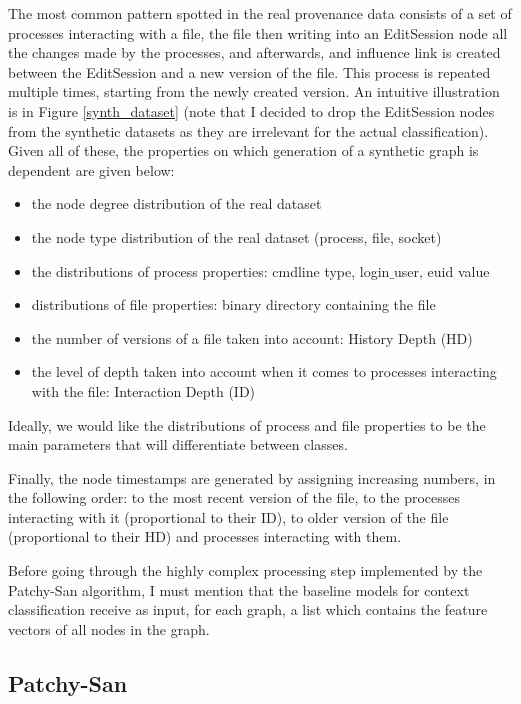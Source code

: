 The most common pattern spotted in the real provenance data consists of a set of processes interacting with a file, the file then writing into an EditSession node all the changes made by the processes, and afterwards, and influence link is created between the EditSession and a new version of the file. This process is repeated multiple times, starting from the newly created version. An intuitive illustration is in Figure \ref{synth_dataset} (note that I decided to drop the EditSession nodes from the synthetic datasets as they are irrelevant for the actual classification). Given all of these, the properties on which generation of a synthetic graph is dependent are given below:

\begin{itemize}
    \item the node degree distribution of the real dataset
    \item the node type distribution of the real dataset (process, file, socket)
    \item the distributions of process properties: cmdline type, login$\_$user, euid value
    \item distributions of file properties: binary directory containing the file
    \item the number of versions of a file taken into account: History Depth (HD)
    \item the level of depth taken into account when it comes to processes interacting with the file: Interaction Depth (ID)
\end{itemize}

Ideally, we would like the distributions of process and file properties to be the main parameters that will differentiate between classes. \smallskip

Finally, the node timestamps are generated by assigning increasing numbers, in the following order: to the most recent version of the file, to the processes interacting with it (proportional to their ID), to older version of the file (proportional to their HD) and processes interacting with them. \smallskip

Before going through the highly complex processing step implemented by the Patchy-San algorithm, I must mention that the baseline models for context classification receive as input, for each graph, a list which contains the feature vectors of all nodes in the graph. \smallskip

\subsection{Patchy-San} \label{PCSN}

